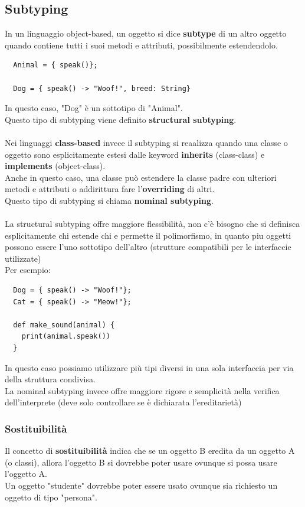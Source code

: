 \documentclass[12pt,a4paper]{article}
\begin{document}
\subsection{Subtyping}
In un linguaggio object-based, un oggetto si dice \textbf{subtype} di un altro oggetto quando contiene tutti i suoi metodi e attributi, possibilmente estendendolo.
\begin{lstlisting}
  Animal = { speak()};

  Dog = { speak() -> "Woof!", breed: String}
\end{lstlisting}
In questo caso, "Dog" è un sottotipo di "Animal".\\
Questo tipo di subtyping viene definito \textbf{structural subtyping}.\\\\
Nei linguaggi \textbf{class-based} invece il subtyping si reaalizza quando una classe o oggetto sono esplicitamente estesi dalle keyword \textbf{inherits} (class-class) e \textbf{implements} (object-class).\\
Anche in questo caso, una classe può estendere la classe padre con ulteriori metodi e attributi o addirittura fare l'\textbf{overriding} di altri.\\
Questo tipo di subtyping si chiama \textbf{nominal subtyping}.\\\\

La structural subtyping offre maggiore flessibilità, non c'è bisogno che si definisca esplicitamente chi estende chi e permette il polimorfismo, in quanto piu oggetti possono essere l'uno sottotipo dell'altro (strutture compatibili per le interfaccie utilizzate)\\
Per esempio:
\begin{lstlisting}
  Dog = { speak() -> "Woof!"};
  Cat = { speak() -> "Meow!"};

  def make_sound(animal) {
    print(animal.speak())
  }
\end{lstlisting}
In questo caso possiamo utilizzare più tipi diversi in una sola interfaccia per via della struttura condivisa.\\
La nominal subtyping invece offre maggiore rigore e semplicità nella verifica dell'interprete (deve solo controllare se è dichiarata l'ereditarietà)
\subsubsection{Sostituibilità}
Il concetto di \textbf{sostituibilità} indica che se un oggetto B eredita da un oggetto A (o classi), allora l'oggetto B si dovrebbe poter usare ovunque si possa usare l'oggetto A.\\
Un oggetto "studente" dovrebbe poter essere usato ovunque sia richiesto un oggetto di tipo "persona".
\end{document}
